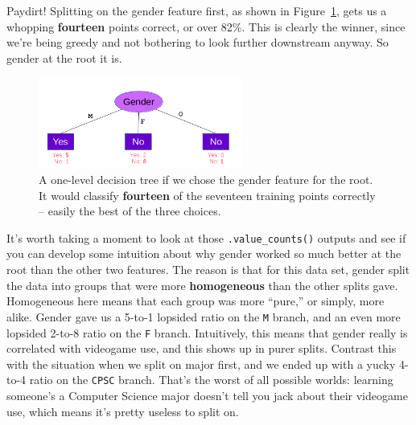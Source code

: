 Paydirt! Splitting on the \textsf{gender} feature first, as shown in
Figure~\ref{fig:genderOnTop}, gets us a whopping \textbf{fourteen} points correct,
or over 82\%. This is clearly the winner, since we're being greedy and not
bothering to look further downstream anyway. So \textsf{gender} at the root it
is.

\begin{figure}[ht]
\centering
\includegraphics[width=0.6\textwidth]{genderOnTop.png}
\caption{A one-level decision tree if we chose the \textsf{gender} feature for
the root. It would classify \textbf{fourteen} of the seventeen training points
correctly -- easily the best of the three choices.}
\label{fig:genderOnTop}
\end{figure}

It's worth taking a moment to look at those \texttt{.value\_counts()} outputs
and see if you can develop some intuition about why \textsf{gender} worked so
much better at the root than the other two features. The reason is that for
this data set, \textsf{gender} split the data into groups that were more
\textbf{homogeneous} than the other splits gave. Homogeneous here means that
each group was more ``pure,'' or simply, more alike. \textsf{Gender} gave us a
5-to-1 lopsided ratio on the \texttt{M} branch, and an even more lopsided
2-to-8 ratio on the \texttt{F} branch. Intuitively, this means that
\textsf{gender} really is correlated with videogame use, and this shows up in
purer splits. Contrast this with the situation when we split on \textsf{major}
first, and we ended up with a yucky 4-to-4 ratio on the \texttt{CPSC} branch.
That's the worst of all possible worlds: learning someone's a Computer Science
major doesn't tell you jack about their videogame use, which means it's pretty
useless to split on.
